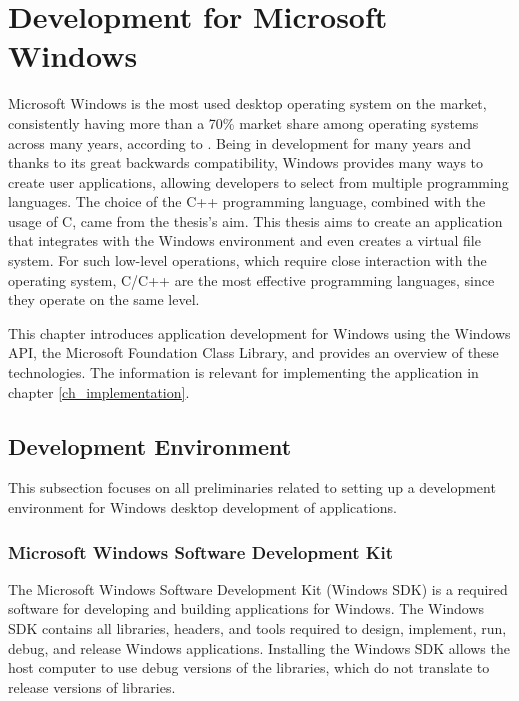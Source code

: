 \section{Development for Microsoft Windows}
Microsoft Windows is the most used desktop operating system on the market, consistently having more than a 70\% market share among operating systems across many years, according to \cite{DesktopOSStats}. Being in development for many years and thanks to its great backwards compatibility, Windows provides many ways to create user applications, allowing developers to select from multiple programming languages. The choice of the C++ programming language, combined with the usage of C, came from the thesis's aim. This thesis aims to create an application that integrates with the Windows environment and even creates a virtual file system. For such low-level operations, which require close interaction with the operating system, C/C++ are the most effective programming languages, since they operate on the same level.

This chapter introduces application development for Windows using the Windows API, the Microsoft Foundation Class Library, and provides an overview of these technologies. The information is relevant for implementing the application in chapter \ref{ch_implementation}.

\subsection{Development Environment}
This subsection focuses on all preliminaries related to setting up a development environment for Windows desktop development of applications.

\subsubsection{Microsoft Windows Software Development Kit}
The Microsoft Windows Software Development Kit (Windows SDK) is a required software for developing and building applications for Windows. The Windows SDK contains all libraries, headers, and tools required to design, implement, run, debug, and release Windows applications. Installing the Windows SDK allows the host computer to use debug versions of the libraries, which do not translate to release versions of libraries.

